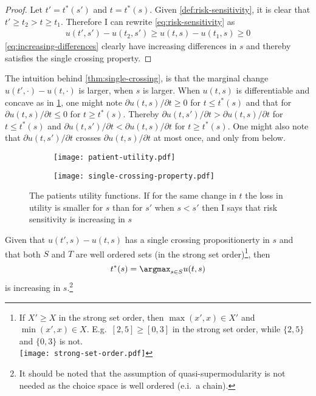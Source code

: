 \begin{proof}
Let \(t'=t^{*}(s')\) and \(t=t^{*}(s)\). Given \cref{def:risk-sensitivity}, it is clear that \(t'\ge t_{2}>t\ge t_{1}\). Therefore I can rewrite \cref{eq:risk-sensitivity} as
\begin{align}
  u(t',s')-u(t_{2},s')\ge u(t,s)-u(t_{1},s)\ge0\label{eq:increasing-differences}
\end{align}
\cref{eq:increasing-differences} clearly have increasing differences in \(s\) and thereby satisfies the single crossing property.
\end{proof}

The intuition behind \cref{thm:single-crossing}, is that the marginal change \(u(t',\cdot)-u(t,\cdot)\) is larger, when \(s\) is larger. When \(u(t,s)\) is differentiable and concave as in \cref{fig:The-patients-utility}, one might note \(\partial u(t,s)/\partial t\ge0\) for \(t\le t^{*}(s)\) and that for \(\partial u(t,s)/\partial t\le0\) for \(t\ge t^{*}(s)\). Thereby \(\partial u(t,s')/\partial t>\partial u(t,s)/\partial t\) for \(t\le t^{*}(s)\) and \(\partial u(t,s')/\partial t<\partial u(t,s)/\partial t\) for \(t\ge t^{*}(s)\). One might also note that \(\partial u(t,s')/\partial t\) crosses \(\partial u(t,s)/\partial t\) at most once, and only from below.

\begin{figure}
     \centering
    \begin{subfigure}[b]{0.49\textwidth}
		\texttt{[image: patient-utility.pdf]}
	\end{subfigure}
    \begin{subfigure}[b]{0.49\textwidth}
		\texttt{[image: single-crossing-property.pdf]}
	\end{subfigure}
\caption{\label{fig:The-patients-utility}The patients utility functions. If for the same change in \(t\) the loss in utility is smaller for \(s\) than for \(s'\)  when \(s<s'\)  then I says that risk sensitivity is increasing in \(s\) }
\end{figure}

\begin{proposition}
Given that \(u(t',s)-u(t,s)\) has a single crossing propositionerty in \(s\) and that both \(S\) and \(T\) are well ordered sets (in the strong set order)\footnote{If \(X' \geq X\) in the strong set order, then \(\max (x',x)\in X'\) and \(\min (x',x)\in X\). E.g.\ \([2,5]\geq[0,3]\) in the strong set order, while \(\{2,5\} \) and \(\{0,3\}\) is not. \\
	\texttt{[image: strong-set-order.pdf]}
}, then
\[
	t^{*}(s)=\argmax_{s\in S}u(t,s)\label{eq:increasing-solution}
\]
is increasing in \(s\).\footnote{It should be noted that the assumption of quasi-supermodularity is not needed as the choice space is well ordered (e.i.\ a chain).}
\end{proposition}

